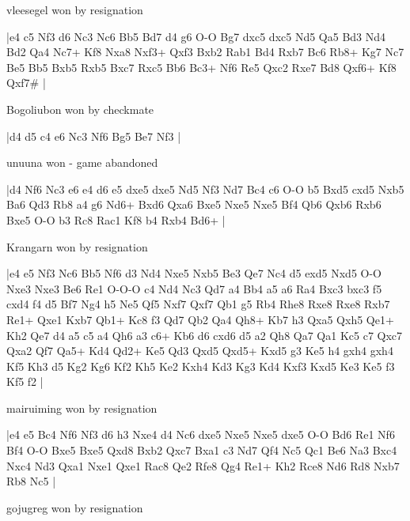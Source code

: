 \showboard

vleesegel won by resignation

\makegametitle
|e4 c5 Nf3 d6 Nc3 Nc6 Bb5 Bd7 d4 g6 O-O Bg7 dxc5 dxc5 Nd5 Qa5 Bd3 Nd4 Bd2 Qa4 Nc7+ Kf8 Nxa8 Nxf3+ Qxf3 Bxb2 Rab1 Bd4 Rxb7 Bc6 Rb8+ Kg7 Nc7 Be5 Bb5 Bxb5 Rxb5 Bxc7 Rxc5 Bb6 Bc3+ Nf6 Re5 Qxc2 Rxe7 Bd8 Qxf6+ Kf8 Qxf7\#  |

\showboard

Bogoliubon won by checkmate

\makegametitle
|d4 d5 c4 e6 Nc3 Nf6 Bg5 Be7 Nf3  |

\showboard

unuuna won - game abandoned

\makegametitle
|d4 Nf6 Nc3 e6 e4 d6 e5 dxe5 dxe5 Nd5 Nf3 Nd7 Bc4 c6 O-O b5 Bxd5 cxd5 Nxb5 Ba6 Qd3 Rb8 a4 g6 Nd6+ Bxd6 Qxa6 Bxe5 Nxe5 Nxe5 Bf4 Qb6 Qxb6 Rxb6 Bxe5 O-O b3 Rc8 Rac1 Kf8 b4 Rxb4 Bd6+  |

\showboard

Krangarn won by resignation

\makegametitle
|e4 e5 Nf3 Nc6 Bb5 Nf6 d3 Nd4 Nxe5 Nxb5 Be3 Qe7 Nc4 d5 exd5 Nxd5 O-O Nxe3 Nxe3 Be6 Re1 O-O-O c4 Nd4 Nc3 Qd7 a4 Bb4 a5 a6 Ra4 Bxc3 bxc3 f5 cxd4 f4 d5 Bf7 Ng4 h5 Ne5 Qf5 Nxf7 Qxf7 Qb1 g5 Rb4 Rhe8 Rxe8 Rxe8 Rxb7 Re1+ Qxe1 Kxb7 Qb1+ Kc8 f3 Qd7 Qb2 Qa4 Qh8+ Kb7 h3 Qxa5 Qxh5 Qe1+ Kh2 Qe7 d4 a5 c5 a4 Qh6 a3 c6+ Kb6 d6 cxd6 d5 a2 Qh8 Qa7 Qa1 Kc5 c7 Qxc7 Qxa2 Qf7 Qa5+ Kd4 Qd2+ Ke5 Qd3 Qxd5 Qxd5+ Kxd5 g3 Ke5 h4 gxh4 gxh4 Kf5 Kh3 d5 Kg2 Kg6 Kf2 Kh5 Ke2 Kxh4 Kd3 Kg3 Kd4 Kxf3 Kxd5 Ke3 Ke5 f3 Kf5 f2  |

\showboard

mairuiming won by resignation

\makegametitle
|e4 e5 Bc4 Nf6 Nf3 d6 h3 Nxe4 d4 Nc6 dxe5 Nxe5 Nxe5 dxe5 O-O Bd6 Re1 Nf6 Bf4 O-O Bxe5 Bxe5 Qxd8 Bxb2 Qxc7 Bxa1 c3 Nd7 Qf4 Nc5 Qc1 Be6 Na3 Bxc4 Nxc4 Nd3 Qxa1 Nxe1 Qxe1 Rac8 Qe2 Rfe8 Qg4 Re1+ Kh2 Rce8 Nd6 Rd8 Nxb7 Rb8 Nc5  |

\showboard

gojugreg won by resignation

